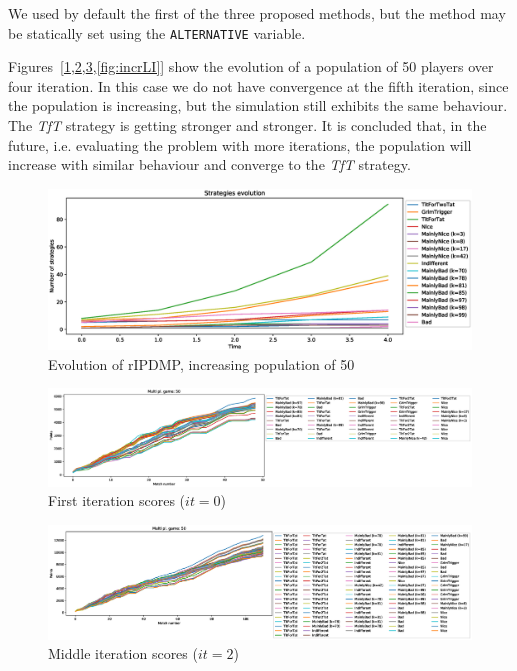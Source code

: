 \documentclass[journal,a4paper,10pt,twoside]{IEEEtran} %
\begin{document}
We used by default the first of the three proposed methods, but the method may be statically set using the \texttt{ALTERNATIVE} variable.

Figures~[\ref{fig:incrR},\ref{fig:incrFI},\ref{fig:incrMI},\ref{fig:incrLI}] show the evolution of a population of 50 players over four iteration. In this case we do not have convergence at the fifth iteration, since the population is increasing, but the simulation still exhibits the same behaviour. The \textit{TfT} strategy is getting stronger and stronger. It is concluded that, in the future, i.e. evaluating the problem with more iterations, the population will increase with similar behaviour and converge to the \textit{TfT} strategy.

\begin{figure}[!ht]
    \centering
    \includegraphics[width=1\columnwidth]{../img/ripdmp-incr/ripdmp-evolution-increasing-pop-50}
    \caption{Evolution of rIPDMP, increasing population of 50}
    \label{fig:incrR}
\end{figure}

\begin{figure}[!ht]
    \centering
    \includegraphics[width=1\columnwidth]{../img/ripdmp-incr/ripdmp-scores-increasing-pop-50-r0}
    \caption{First iteration scores ($it=0$)}
    \label{fig:incrFI}
\end{figure}

\begin{figure}[!ht]
    \centering
    \includegraphics[width=1\columnwidth]{../img/ripdmp-incr/ripdmp-scores-increasing-pop-50-r2}
    \caption{Middle iteration scores ($it=2$)}
    \label{fig:incrMI}
\end{figure}
\end{document}
